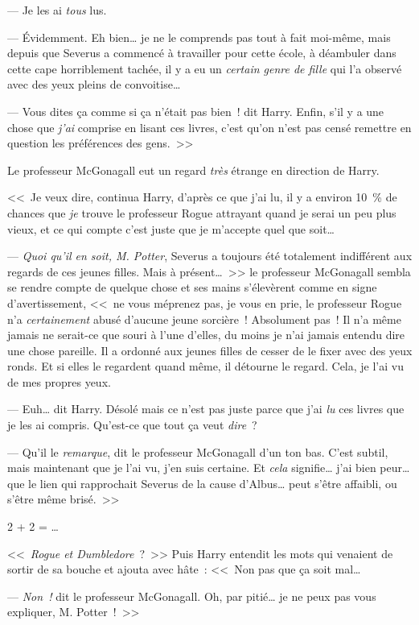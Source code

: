 --- Je les ai \emph{tous} lus.

--- Évidemment. Eh bien… je ne le comprends pas tout à fait moi-même, mais depuis que Severus a commencé à travailler pour cette école, à déambuler dans cette cape horriblement tachée, il y a eu un \emph{certain genre de fille} qui l'a observé avec des yeux pleins de convoitise…

--- Vous dites ça comme si ça n'était pas bien~! dit Harry. Enfin, s'il y a une chose que \emph{j'ai} comprise en lisant ces livres, c'est qu'on n'est pas censé remettre en question les préférences des gens.~>>

Le professeur McGonagall eut un regard \emph{très} étrange en direction de Harry.

<<~Je veux dire, continua Harry, d'après ce que j'ai lu, il y a environ 10~\% de chances que \emph{je} trouve le professeur Rogue attrayant quand je serai un peu plus vieux, et ce qui compte c'est juste que je m'accepte quel que soit…

--- \emph{Quoi qu'il en soit, M. Potter}, Severus a toujours été totalement indifférent aux regards de ces jeunes filles. Mais à présent…~>> le professeur McGonagall sembla se rendre compte de quelque chose et ses mains s'élevèrent comme en signe d'avertissement, <<~ne vous méprenez pas, je vous en prie, le professeur Rogue n'a \emph{certainement} abusé d'aucune jeune sorcière~! Absolument pas~! Il n'a même jamais ne serait-ce que souri à l'une d'elles, du moins je n'ai jamais entendu dire une chose pareille. Il a ordonné aux jeunes filles de cesser de le fixer avec des yeux ronds. Et si elles le regardent quand même, il détourne le regard. Cela, je l'ai vu de mes propres yeux.

--- Euh… dit Harry. Désolé mais ce n'est pas juste parce que j'ai \emph{lu} ces livres que je les ai compris. Qu'est-ce que tout ça veut \emph{dire}~?

--- Qu'il le \emph{remarque}, dit le professeur McGonagall d'un ton bas. C'est subtil, mais maintenant que je l'ai vu, j'en suis certaine. Et \emph{cela} signifie… j'ai bien peur… que le lien qui rapprochait Severus de la cause d'Albus… peut s'être affaibli, ou s'être même brisé.~>>

2 + 2 = …

<<~\emph{Rogue et Dumbledore}~?~>> Puis Harry entendit les mots qui venaient de sortir de sa bouche et ajouta avec hâte~: <<~Non pas que ça soit mal…

--- \emph{Non~!} dit le professeur McGonagall. Oh, par pitié… je ne peux pas vous expliquer, M. Potter~!~>>

